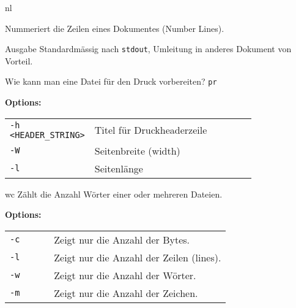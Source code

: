 \begin{flashcard}[Command]{nl}
	\begin{description}
		\item Nummeriert die Zeilen eines Dokumentes (Number Lines).
		
		\item Ausgabe Standardmässig nach \texttt{stdout}, Umleitung in anderes Dokument von Vorteil.
		
		\item {}
	\end{description}
\end{flashcard}

\begin{flashcard}[Command]{Wie kann man eine Datei für den Druck vorbereiten?}
	\texttt{pr}
	
	\textbf{Options:}
	
	\begin{tabular}{lp{0.8\linewidth}}
		\texttt{-h <HEADER\_STRING>}	& Titel für Druckheaderzeile \\
		\texttt{-W} 					& Seitenbreite (width)\\
		\texttt{-l}						& Seitenlänge\\
	\end{tabular}
	
	
\end{flashcard}

\begin{flashcard}[Command]{wc}
	Zählt die Anzahl Wörter einer oder mehreren Dateien.
	
	\textbf{Options:}
	
	\begin{tabular}{lp{0.8\linewidth}}
		\texttt{-c} & Zeigt nur die Anzahl der Bytes.\\
		\texttt{-l} & Zeigt nur die Anzahl der Zeilen (lines).\\
		\texttt{-w} & Zeigt nur die Anzahl der Wörter.\\
		\texttt{-m} & Zeigt nur die Anzahl der Zeichen.\\
	\end{tabular}
\end{flashcard}

